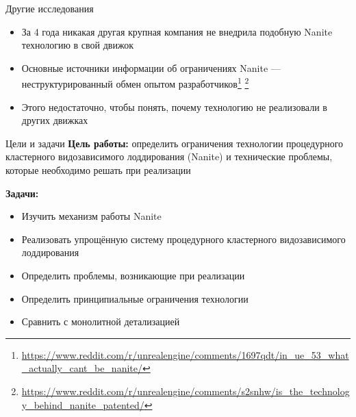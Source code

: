 \begin{frame}{Другие исследования}
    \begin{itemize}
        \item За 4 года никакая другая крупная компания не внедрила подобную Nanite технологию в свой движок
        \item Основные источники информации об ограничениях Nanite --- неструктурированный обмен опытом разработчиков\footnote{\url{https://www.reddit.com/r/unrealengine/comments/1697qdt/in_ue_53_what_actually_cant_be_nanite/}} \footnote{\url{https://www.reddit.com/r/unrealengine/comments/s2snhw/is_the_technology_behind_nanite_patented/}}
        \item Этого недостаточно, чтобы понять, почему технологию не реализовали в других движках
    \end{itemize}
\end{frame}

\begin{frame}{Цели и задачи}
    \textbf{Цель работы:}
    определить ограничения технологии процедурного кластерного видозависимого лоддирования (Nanite) и технические проблемы, которые необходимо решать при реализации

    \bigskip

    \textbf{Задачи:}
    \begin{itemize}
        \item Изучить механизм работы Nanite
        \item Реализовать упрощённую систему процедурного кластерного видозависимого лоддирования
        \item Определить проблемы, возникающие при реализации
        \item Определить принципиальные ограничения технологии
        \item Сравнить с монолитной детализацией
    \end{itemize}
\end{frame}
